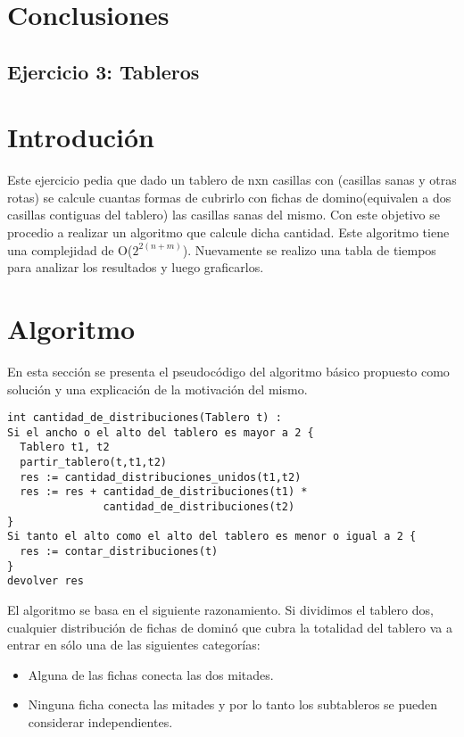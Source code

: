 \documentclass[a4paper, 12pt] {article}
\begin{document}
\section*{Conclusiones}
\newpage

\begin{center}
 \section*{Ejercicio 3: Tableros}
\end{center}

\bigskip
\section*{Introduci\'on}
Este ejercicio pedia que dado un tablero de nxn casillas con (casillas sanas y otras rotas) se calcule cuantas formas de cubrirlo con fichas de domino(equivalen a dos casillas contiguas del tablero) las casillas sanas del mismo.
Con este objetivo se procedio a realizar un algoritmo que calcule dicha cantidad. Este algoritmo tiene una complejidad de O($2^{2\left(n+m \right) }$). Nuevamente se realizo una tabla de tiempos para analizar los resultados y luego graficarlos. 
\section*{Algoritmo}
En esta secci\'on se presenta el pseudoc\'odigo del algoritmo b\'asico propuesto como soluci\'on y una explicaci\'on de la motivaci\'on del mismo.
\begin{verbatim}
int cantidad_de_distribuciones(Tablero t) :
Si el ancho o el alto del tablero es mayor a 2 {
  Tablero t1, t2
  partir_tablero(t,t1,t2)
  res := cantidad_distribuciones_unidos(t1,t2) 
  res := res + cantidad_de_distribuciones(t1) * 
               cantidad_de_distribuciones(t2)
}
Si tanto el alto como el alto del tablero es menor o igual a 2 {
  res := contar_distribuciones(t)
}
devolver res
\end{verbatim}

El algoritmo se basa en el siguiente razonamiento.
Si dividimos el tablero dos, cualquier distribuci\'on de fichas de domin\'o que cubra la totalidad del tablero va a entrar en s\'olo una de las siguientes categor\'ias:
\begin{itemize}
 \item Alguna de las fichas conecta las dos mitades.
 \item Ninguna ficha conecta las mitades y por lo tanto los subtableros se pueden considerar independientes.
\end{itemize} 
\end{document}
